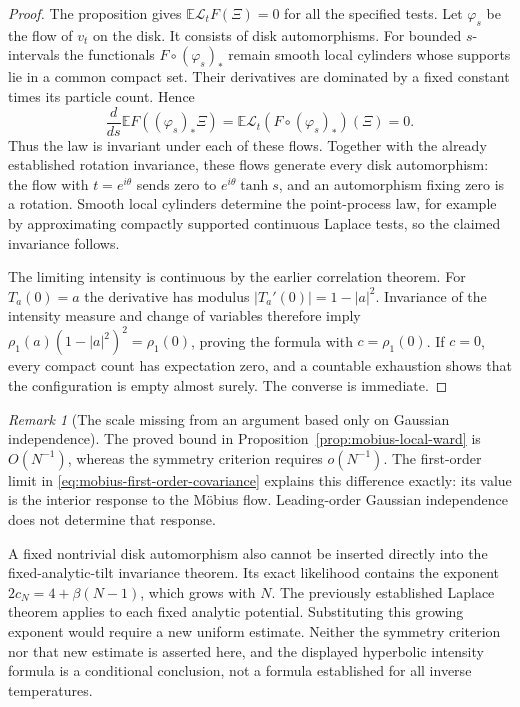 \documentclass[11pt,a4paper]{article}
\numberwithin{equation}{section}
\theoremstyle{definition}
\theoremstyle{remark}
\newtheorem{remark}[theorem]{Remark}
\begin{document}
\begin{proof}
The proposition gives $\mathbb E\mathcal L_tF(\Xi)=0$ for all the
specified tests. Let $\varphi_s$ be the flow of $v_t$ on the disk.
It consists of disk automorphisms. For bounded $s$-intervals the
functionals $F\circ(\varphi_s)_*$ remain smooth local cylinders whose
supports lie in a common compact set. Their derivatives are dominated
by a fixed constant times its particle count. Hence
\[
 \frac d{ds}\mathbb EF((\varphi_s)_*\Xi)
 =\mathbb E\mathcal L_t(F\circ(\varphi_s)_*)(\Xi)=0.
\]
Thus the law is invariant under each of these flows. Together with the
already established rotation invariance, these flows generate every
disk automorphism: the flow with $t=e^{i\theta}$ sends zero to
$e^{i\theta}\tanh s$, and an automorphism fixing zero is a rotation.
Smooth local cylinders determine the point-process law, for example by
approximating compactly supported continuous Laplace tests, so the
claimed invariance follows.

The limiting intensity is continuous by the earlier correlation theorem.
For $T_a(0)=a$ the derivative has modulus $|T_a'(0)|=1-|a|^2$.
Invariance of the intensity measure and change of variables therefore
imply
$\rho_1(a)(1-|a|^2)^2=\rho_1(0)$, proving the formula with
$c=\rho_1(0)$. If $c=0$, every compact count has expectation zero, and
a countable exhaustion shows that the configuration is empty almost
surely. The converse is immediate.
\end{proof}

\begin{remark}[The scale missing from an argument based only on Gaussian independence]
The proved bound in Proposition~\ref{prop:mobius-local-ward} is
$O(N^{-1})$, whereas the symmetry criterion requires $o(N^{-1})$.
The first-order limit in \eqref{eq:mobius-first-order-covariance} explains
this difference exactly: its value is the interior response to the
M\"obius flow. Leading-order Gaussian independence does not determine
that response.

A fixed nontrivial disk automorphism also cannot be inserted directly
into the fixed-analytic-tilt invariance theorem. Its exact likelihood
contains the exponent $2c_N=4+\beta(N-1)$, which grows with $N$.
The previously established Laplace theorem applies to each fixed
analytic potential. Substituting this growing exponent would require
a new uniform estimate. Neither the symmetry criterion nor that new
estimate is asserted here, and the displayed hyperbolic intensity
formula is a conditional conclusion, not a formula established for
all inverse temperatures.
\end{remark}
\end{document}
